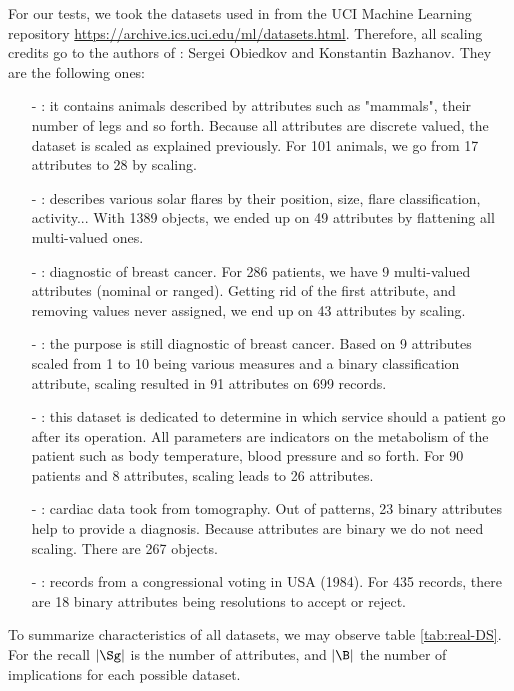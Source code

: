 For our tests, we took the datasets used in \cite{bazhanov_optimizations_2014} from the UCI Machine Learning repository \url{https://archive.ics.uci.edu/ml/datasets.html}. Therefore, all scaling credits go to the authors of \cite{bazhanov_optimizations_2014}: Sergei Obiedkov and Konstantin Bazhanov. They are the following ones:
\begin{itemize}
	\item[-] : it contains animals described by attributes such as "mammals", their number of legs and so forth. Because all attributes are discrete valued, the dataset is scaled as explained previously. For 101 animals, we go from 17 attributes to 28 by scaling.
	\item[-] : describes various solar flares by their position, size, flare classification, activity... With 1389 objects, we ended up on 49 attributes by flattening all multi-valued ones.
	\item[-] : diagnostic of breast cancer. For 286 patients, we have 9 multi-valued attributes (nominal or ranged). Getting rid of the first attribute, and removing values never assigned, we end up
	on 43 attributes by scaling.
	\item[-] : the purpose is still diagnostic of
	breast cancer. Based on 9 attributes scaled from 1 to 10 being various measures and a binary classification attribute, scaling resulted in 91 attributes on 699 records.
	\item[-] : this dataset is dedicated to determine in which service should a patient go after its operation. All parameters are indicators on the metabolism of the patient such as body temperature,
	blood pressure and so forth. For 90 patients and 8 attributes, scaling leads to 26 attributes.
	\item[-] : cardiac data took from tomography. Out of patterns, 23 binary attributes help to provide a diagnosis. Because attributes are binary we do not need scaling. There are 267 objects.
	\item[-] : records from a congressional voting in USA
	(1984). For 435 records, there are 18 binary attributes being resolutions
	to accept or reject.
\end{itemize}

To summarize characteristics of all datasets, we may observe table \ref{tab:real-DS}. For the recall $|\Sg|$ is the number of attributes, and 
$|\B|$ the number of implications for each possible dataset.

